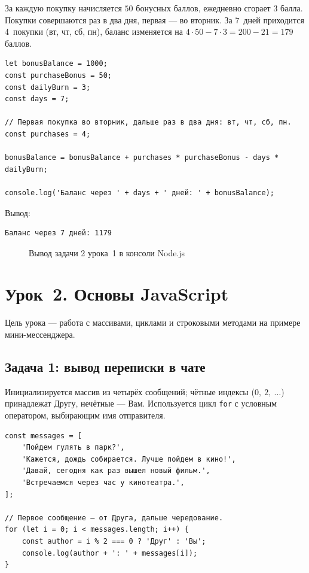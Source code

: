 За каждую покупку начисляется \(50\) бонусных баллов, ежедневно
сгорает \(3\) балла. Покупки совершаются раз в два дня, первая ---
во вторник. За 7~дней приходится 4~покупки (вт, чт, сб, пн), баланс
изменяется на \(4 \cdot 50 - 7 \cdot 3 = 200 - 21 = 179\) баллов.

\begin{lstlisting}[caption={\texttt{les-1/task2.js} --- баланс через 7 дней},captionpos=b]
let bonusBalance = 1000;
const purchaseBonus = 50;
const dailyBurn = 3;
const days = 7;

// Первая покупка во вторник, дальше раз в два дня: вт, чт, сб, пн.
const purchases = 4;

bonusBalance = bonusBalance + purchases * purchaseBonus - days * dailyBurn;

console.log('Баланс через ' + days + ' дней: ' + bonusBalance);
\end{lstlisting}

Вывод:

\begin{lstlisting}
Баланс через 7 дней: 1179
\end{lstlisting}

\begin{figure}[h]
  \centering
  \caption{Вывод задачи 2 урока~1 в консоли Node.js}
  \label{fig:les1_task2}
\end{figure}

\section{Урок~2. Основы JavaScript}

Цель урока --- работа с массивами, циклами и строковыми методами на
примере мини-мессенджера.

\subsection{Задача 1: вывод переписки в чате}

Инициализируется массив из четырёх сообщений; чётные индексы
(\(0,~2,~\dots\)) принадлежат Другу, нечётные --- Вам. Используется
цикл \texttt{for} с условным оператором, выбирающим имя отправителя.

\begin{lstlisting}[caption={\texttt{les-2/task1.js} --- вывод переписки},captionpos=b]
const messages = [
    'Пойдем гулять в парк?',
    'Кажется, дождь собирается. Лучше пойдем в кино!',
    'Давай, сегодня как раз вышел новый фильм.',
    'Встречаемся через час у кинотеатра.',
];

// Первое сообщение — от Друга, дальше чередование.
for (let i = 0; i < messages.length; i++) {
    const author = i % 2 === 0 ? 'Друг' : 'Вы';
    console.log(author + ': ' + messages[i]);
}
\end{lstlisting}

